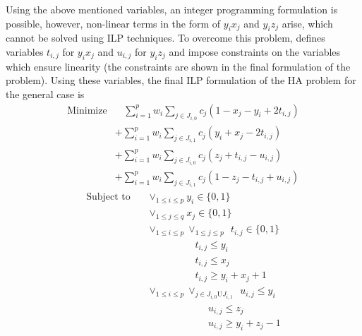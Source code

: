\documentclass[10pt,twocolumn]{witseiepaper}
\begin{document}
Using the above mentioned variables, an integer programming formulation is possible, however, non-linear 
terms in the form of $y_ix_j$ and $y_iz_j$ arise, which cannot be solved using ILP techniques. To overcome
this problem, \cite{chen:2013} defines variables $t_{i,j}$ for $y_ix_j$ and $u_{i,j}$ for $y_iz_j$ and impose
constraints on the variables which ensure linearity (the constraints are shown in the final formulation of the
problem). Using these variables, the final ILP formulation of the HA problem for the general case is 
\begin{equation*}
\begin{split}
    \textrm{Minimize} 
    &\ \ \ \ \sum_{i = 1}^{p}{w_i} \sum_{j \in J_{i, 0} }^{}{c_j(1 - x_j - y_i + 2t_{i,j})}     \\
    &+ \sum_{i = 1}^{p}{w_i} \sum_{j \in J_{i, 1}}^{}{c_j(y_i + x_j - 2t_{i,j})}                \\
    &+ \sum_{i = 1}^{p}{w_i} \sum_{j \in J_{i, 0}}^{}{c_j(z_j + t_{i,j} - u_{i,j})}             \\
    &+ \sum_{i = 1}^{p}{w_i} \sum_{j \in J_{i, 1}}^{}{c_j(1 - z_j - t_{i,j} + u_{i,j})}
\end{split}
\end{equation*}
\begin{equation*}
\begin{split}
    \textrm{Subject to} 
    &\ \ \ \ \vee_{1 \le i \le p} y_i \in \{0, 1\}                                              \\
    &\ \ \ \ \vee_{1 \le j \le q} x_j \in \{0, 1\}                                              \\
    &\ \ \ \ \vee_{1 \le i \le p} \vee_{1 \le j \le p} \ \ t_{i,j} \in \{0, 1\}                 \\
    &\ \ \ \ \ \ \ \ \ \ \ \ \ \ \ \ \ \ \ \ \ \ \ \ \ \ t_{i,j} \le y_i                        \\ 
    &\ \ \ \ \ \ \ \ \ \ \ \ \ \ \ \ \ \ \ \ \ \ \ \ \ \ t_{i,j} \le x_j                        \\ 
    &\ \ \ \ \ \ \ \ \ \ \ \ \ \ \ \ \ \ \ \ \ \ \ \ \ \ t_{i,j} \ge y_i + x_j + 1              \\
    &\ \ \ \ \vee_{1 \le i \le p} \vee_{j \in J_{i,0} \textrm{U} J_{i,1}} \ \ u_{i,j} \le y_i   \\
    &\ \ \ \ \ \ \ \ \ \ \ \ \ \ \ \ \ \ \ \ \ \ \ \ \ \ \ \ \ \ \ \ u_{i,j} \le z_j            \\
    &\ \ \ \ \ \ \ \ \ \ \ \ \ \ \ \ \ \ \ \ \ \ \ \ \ \ \ \ \ \ \ \ u_{i,j} \ge y_i + z_j - 1 
    \end{split}
\end{equation*}
\end{document}
